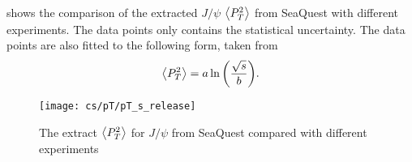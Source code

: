 \documentclass[../main.tex]{subfiles}
\begin{document}
 shows the comparison of the extracted $J/\psi$ $\expval{P_T^2}$ from SeaQuest with different
experiments. The data points only contains the statistical uncertainty. The data points are also fitted to the following form, taken from 
\begin{equation}
	\expval{P_T^2}=a\ln{\left( \frac{\sqrt{s}}{b} \right)}.
\end{equation}
\begin{figure}
	\centering
	\texttt{[image: cs/pT/pT\_s\_release]}
	\caption{The extract $\expval{P_T^2}$ for $J/\psi$ from SeaQuest compared with different experiments}
	\label{fig:pT_s}
\end{figure}



\ifSubfilesClassLoaded{ \printbibliography[heading=bibintoc,title={References}]}{}
\end{document}
